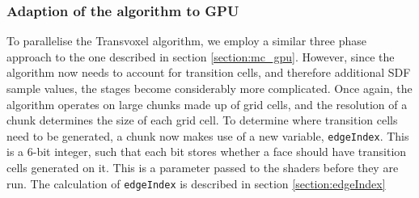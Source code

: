 \documentclass{article}
\begin{document}
\subsubsection{Adaption of the algorithm to GPU}

To parallelise the Transvoxel algorithm, we employ a similar three phase approach to the one described in section \ref{section:mc_gpu}. However, since the algorithm now needs to account for transition cells, and therefore additional SDF sample values, the stages become considerably more complicated. Once again, the algorithm operates on large chunks made up of grid cells, and the resolution of a chunk determines the size of each grid cell. To determine where transition cells need to be generated, a chunk now makes use of a new variable, \texttt{edgeIndex}. This is a 6-bit integer, such that each bit stores whether a face should have transition cells generated on it. This is a parameter passed to the shaders before they are run. The calculation of \texttt{edgeIndex} is described in section \ref{section:edgeIndex}
\end{document}
